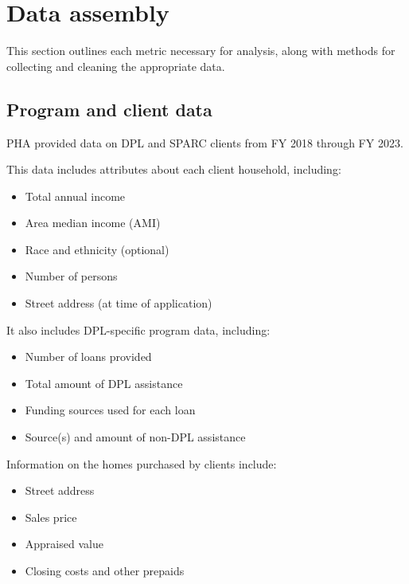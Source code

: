 \documentclass[
  letterpaper,
  DIV=11,
  numbers=noendperiod]{scrartcl}
\providecommand{\tightlist}{%
  \setlength{\itemsep}{0pt}\setlength{\parskip}{0pt}}\usepackage{longtable,booktabs,array}
\begin{document}
\hypertarget{data-assembly}{%
\section{Data assembly}\label{data-assembly}}

This section outlines each metric necessary for analysis, along with
methods for collecting and cleaning the appropriate data.

\hypertarget{program-and-client-data}{%
\subsection{Program and client data}\label{program-and-client-data}}

PHA provided data on DPL and SPARC clients from FY 2018 through FY 2023.

This data includes attributes about each client household, including:

\begin{itemize}
\tightlist
\item
  Total annual income
\item
  Area median income (AMI)
\item
  Race and ethnicity (optional)
\item
  Number of persons
\item
  Street address (at time of application)
\end{itemize}

It also includes DPL-specific program data, including:

\begin{itemize}
\tightlist
\item
  Number of loans provided
\item
  Total amount of DPL assistance
\item
  Funding sources used for each loan
\item
  Source(s) and amount of non-DPL assistance
\end{itemize}

Information on the homes purchased by clients include:

\begin{itemize}
\tightlist
\item
  Street address
\item
  Sales price
\item
  Appraised value
\item
  Closing costs and other prepaids
\end{itemize}
\end{document}
